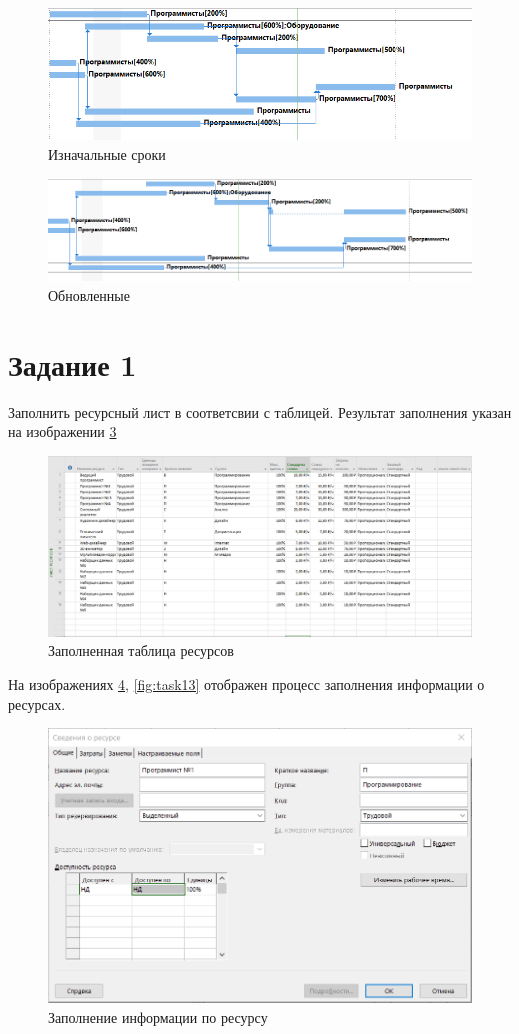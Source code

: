 \begin{figure}[H]
	\centering
	\includegraphics[width=0.7\linewidth]{src/task0_4}
	\caption{Изначальные сроки}
	\label{fig:task04}
\end{figure}
\begin{figure}[H]
	\centering
	\includegraphics[width=0.7\linewidth]{src/task0_3}
	\caption{Обновленные}
	\label{fig:task03}
\end{figure}

\section{Задание 1}
Заполнить ресурсный лист в соответсвии с таблицей. Результат заполнения указан на изображении \ref{fig:task11}

\begin{figure}[H]
	\centering
	\includegraphics[width=0.7\linewidth]{src/task1_1}
	\caption{Заполненная таблица ресурсов}
	\label{fig:task11}
\end{figure}

На изображениях \ref{fig:task12}, \ref{fig:task13} отображен процесс заполнения информации о ресурсах.

\begin{figure}[H]
	\centering
	\includegraphics[width=0.7\linewidth]{src/task1_2}
	\caption{Заполнение информации по ресурсу}
	\label{fig:task12}
\end{figure}

